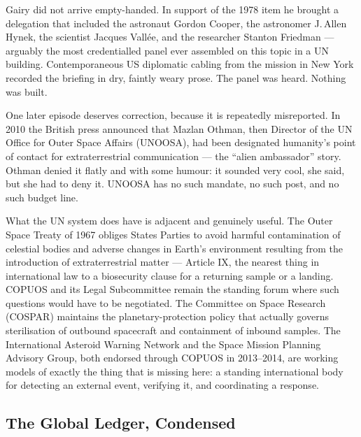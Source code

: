 \begin{funfact}
 Gairy did not arrive empty-handed. In support of
the 1978 item he brought a delegation that included the astronaut Gordon Cooper, the astronomer
J.\,Allen Hynek, the scientist Jacques Vall\'ee, and the researcher Stanton Friedman --- arguably
the most credentialled panel ever assembled on this topic in a UN building. Contemporaneous US
diplomatic cabling from the mission in New York recorded the briefing in dry, faintly weary prose.
The panel was heard. Nothing was built.
\end{funfact}

One later episode deserves correction, because it is repeatedly misreported. In 2010 the British
press announced that Mazlan Othman, then Director of the UN Office for Outer Space Affairs
(UNOOSA), had been designated humanity's point of contact for extraterrestrial communication ---
the ``alien ambassador'' story. Othman denied it flatly and with some humour: it sounded very
cool, she said, but she had to deny it. UNOOSA has no such mandate, no such post, and no such
budget line. 

What the UN system does have is adjacent and genuinely useful. The Outer Space Treaty of 1967
obliges States Parties to avoid harmful contamination of celestial bodies and adverse changes in
Earth's environment resulting from the introduction of extraterrestrial matter --- Article IX, the
nearest thing in international law to a biosecurity clause for a returning sample or a landing.
COPUOS and its Legal Subcommittee remain the standing forum where such questions would have to be
negotiated. The Committee on Space Research (COSPAR) maintains the planetary-protection policy that
actually governs sterilisation of outbound spacecraft and containment of inbound samples. The
International Asteroid Warning Network and the Space Mission Planning Advisory Group, both endorsed
through COPUOS in 2013--2014, are working models of exactly the thing that is missing here: a
standing international body for detecting an external event, verifying it, and coordinating a
response. 

\subsection{The Global Ledger, Condensed}

